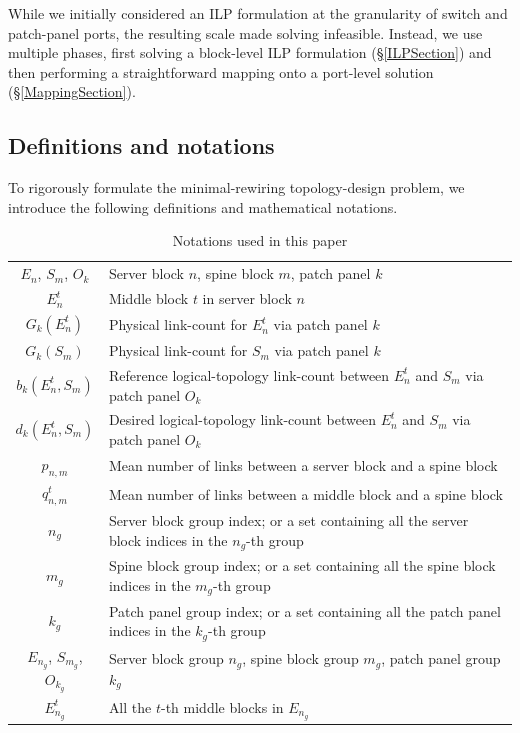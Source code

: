 \documentclass[letterpaper,twocolumn,10pt]{article}
\begin{document}
While we initially considered an ILP formulation at the granularity of switch and patch-panel ports, the resulting scale made solving infeasible. Instead, we use multiple phases, first solving a block-level ILP formulation (\S\ref{ILPSection}) and then performing a straightforward mapping onto a port-level solution (\S\ref{MappingSection}).

\subsection{Definitions and notations}\label{DefinitionsSection}

To rigorously formulate the minimal-rewiring topology-design problem, we introduce the following definitions and mathematical notations.

\begin{table}[ht]
\small
\centering
\caption{Notations used in this paper}
\begin{tabular}{|c|p{2.4in}|}
\hline
$E_n$, $S_m$, $O_k$ & Server block $n$, spine block $m$, patch panel $k$\\
$E_n^t$ & Middle block $t$ in server block $n$ \\
\hline
$G_k(E_n^t) $ & Physical link-count for $E_n^t$ via patch panel $k$ \\
$G_k(S_m) $ & Physical link-count for $S_m$ via patch panel $k$ \\
$b_k(E_n^t, S_m)$ & Reference logical-topology link-count between $E_n^t$ and $S_m$ via patch panel $O_k$ \\
$d_k(E_n^t, S_m)$ & Desired logical-topology link-count between $E_n^t$ and $S_m$ via patch panel $O_k$ \\
\hline
$p_{n,m}$ & Mean number of links between a server block and a spine block \\
$q^t_{n,m}$ & Mean number of links between a middle block and a spine block \\
\hline
$n_g$ & Server block group index; or a set containing all the server block indices in the $n_g$-th group \\
$m_g$ & Spine block group index; or a set containing all the spine block indices in the $m_g$-th group \\
$k_g$ & Patch panel group index; or a set containing all the patch panel indices in the $k_g$-th group \\
\hline
$E_{n_g}$, $S_{m_g}$, $O_{k_g}$ & Server block group $n_g$, spine block group $m_g$, patch panel group $k_g$\\
$E_{n_g}^t$ & All the $t$-th middle blocks in $E_{n_g}$ \\

\end{tabular}
\end{table}
\end{document}
